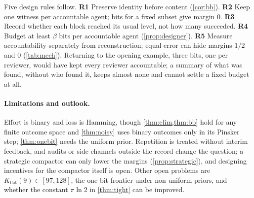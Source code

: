 \documentclass[sigconf,anonymous,acmthm=false]{aamas}
\theoremstyle{acmplain}
\theoremstyle{acmdefinition}
\newcommand{\Kflat}{K_{\mathrm{flat}}}
\begin{document}
Five design rules follow. \textbf{R1} Preserve identity before content (\cref{cor:bb}).
\textbf{R2} Keep one witness per accountable agent; bits for a fixed subset give margin 0.
\textbf{R3} Record whether each block reached its usual level, not how many succeeded. \textbf{R4} Budget at least $\beta$ bits per
accountable agent (\cref{prop:designer}). \textbf{R5} Measure accountability separately from
reconstruction; equal error can hide margins $1/2$ and 0 (\cref{tab:mech}). Returning to the
opening example, three bits, one per reviewer, would have kept every reviewer accountable;
a summary of what was found, without who found it, keeps almost none and cannot settle a fixed budget at all.

\paragraph{Limitations and outlook.} Effort is binary and loss is Hamming, though
\cref{thm:elim,thm:bb} hold for any finite outcome space and \cref{thm:noisy} uses binary
outcomes only in its Pinsker step; \cref{thm:onebit} needs the uniform prior. Repetition is
treated without interim feedback, and audits or side channels outside the record change the
question; a strategic compactor can only lower the margins
(\cref{prop:strategic}), and designing incentives for the compactor itself is open. Other open
problems are $\Kflat(9)\in[97,128]$, the one-bit frontier under non-uniform priors, and
whether the constant $\pi\ln2$ in \cref{thm:tight} can be improved.

\label{endbody}\clearpage
\balance


\end{document}
